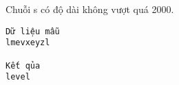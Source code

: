 Chuỗi s có độ dài không vượt quá 2000.
\begin{verbatim}
Dữ liệu mẫu
lmevxeyzl

Kết qủa
level
\end{verbatim}